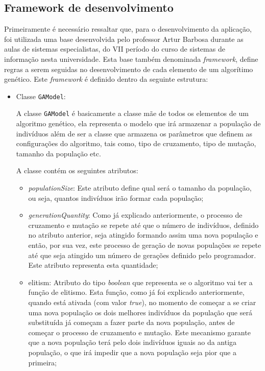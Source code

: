 \subsection{Framework de desenvolvimento}
\par Primeiramente é necessário ressaltar que, para o desenvolvimento da aplicação, foi utilizada uma base desenvolvida pelo professor Artur Barbosa durante as aulas de sistemas especialistas, do VII período do curso de sistemas de informação nesta universidade.
Esta base também denominada \textit{framework}, define regras a serem seguidas no desenvolvimento de cada elemento
de um algorítimo genético. Este \textit{framework} é definido dentro da seguinte estrutura:

 \begin{itemize}
 	
 	\item Classe \texttt{GAModel}:
 		\par A classe \texttt{GAModel} é basicamente a classe mãe de todos os elementos de um algoritmo genético, ela representa o modelo que irá armazenar a população de indivíduos além de ser a classe que armazena os parâmetros que definem as configurações do algoritmo, tais como, tipo de cruzamento, tipo de mutação, tamanho da população etc.
 		
 		\par A classe contém os seguintes atributos:
 		
 		\begin{itemize} 
 			\item \textit{populationSize}:
	 			Este atributo define qual será o tamanho da população, ou seja, quantos indivíduos irão formar cada população;
	 			
	 		\item \textit{generationQuantity}:
		 		Como já explicado anteriormente, o processo de cruzamento e mutação se repete até que o número de indivíduos, definido 
		 		no atributo anterior, seja atingido formando assim uma nova população e então, por sua vez, este processo de geração 
		 		de novas populações se repete até que seja atingido um número de gerações definido pelo programador. Este atributo 
		 		representa esta quantidade;
		 		
		 	\item{elitism}:
			 	Atributo do tipo \textit{boolean} que representa se o algoritmo vai ter a função de elitismo. Esta função, como já foi
			 	explicado anteriormente, quando está ativada (com valor \textit{true}), no momento de começar a se criar uma nova população os dois melhores indivíduos da população que será substituída já começam a fazer parte da nova população, antes de começar o processo de cruzamento e mutação. Este mecanismo garante que a nova população terá pelo dois indivíduos iguais ao da antiga população, o que irá impedir que a nova população seja pior que a primeira;
			 	

\end{itemize}
\end{itemize}

